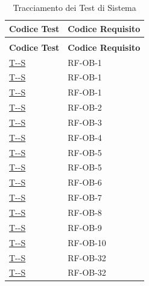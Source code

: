 \documentclass[a4paper,12pt]{article}
\newcounter{testsys}
\newcommand{\systestref}{%
  \hyperlink{T-\arabic{testsys}-S}{T-\arabic{testsys}-S}%
}
\begin{document}
\begin{longtable}{|>{\centering\arraybackslash}p{5cm}|>{\centering\arraybackslash}p{9cm}|}

\hline
\rowcolor{gray!60}
\textbf{Codice Test} & \textbf{Codice Requisito} \\
\hline
\endfirsthead
\caption[]{Tracciamento dei Test di Sistema} \\
\hline
\rowcolor{gray!60}
\textbf{Codice Test} & \textbf{Codice Requisito} \\
\hline
\endhead

\stepcounter{testsys}
\systestref & RF-OB-1 \\
\hline

\stepcounter{testsys}
\systestref & RF-OB-1 \\
\hline

\stepcounter{testsys}
\systestref & RF-OB-1 \\
\hline

\stepcounter{testsys}
\systestref & RF-OB-2 \\
\hline

\stepcounter{testsys}
\systestref & RF-OB-3 \\
\hline

\stepcounter{testsys}
\systestref & RF-OB-4 \\
\hline

\stepcounter{testsys}
\systestref & RF-OB-5 \\
\hline

\stepcounter{testsys}
\systestref & RF-OB-5 \\
\hline

\stepcounter{testsys}
\systestref & RF-OB-6 \\
\hline

\stepcounter{testsys}
\systestref & RF-OB-7 \\
\hline

\stepcounter{testsys}
\systestref & RF-OB-8 \\
\hline

\stepcounter{testsys}
\systestref & RF-OB-9 \\
\hline

\stepcounter{testsys}
\systestref & RF-OB-10 \\
\hline

\stepcounter{testsys}
\systestref & RF-OB-32 \\
\hline

\stepcounter{testsys}
\systestref & RF-OB-32 \\
\hline


\end{longtable}
\end{document}
